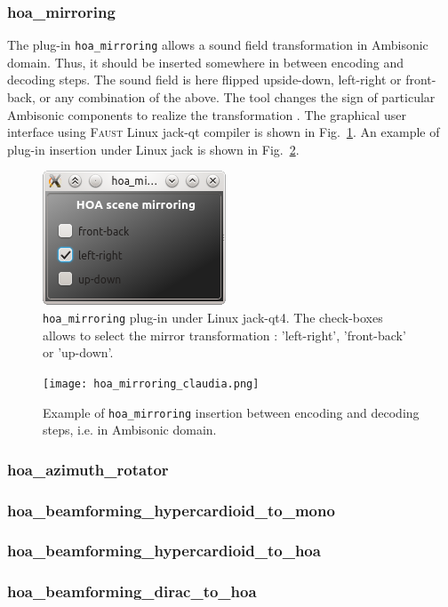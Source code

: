 \documentclass[10pt,a4paper]{article}
\begin{document}
\subsubsection{hoa\_mirroring}
The plug-in \lstinline'hoa_mirroring' allows a sound field transformation in Ambisonic domain. Thus, it should be inserted somewhere in between encoding and decoding steps. The sound field is here flipped upside-down, left-right or front-back, or any combination of the above. The tool changes the sign of particular Ambisonic components to realize the transformation \cite{kronlachner2014spatial}. The graphical user interface using \textsc{Faust} Linux jack-qt compiler is shown in Fig.~\ref{fig:hoa_mirroring}. An example of plug-in insertion under Linux jack is shown in Fig.~\ref{fig:hoa_mirroring_claudia}.
\begin{figure}[!ht]
\centering
\includegraphics[width=0.3\columnwidth]{hoa_mirroring.png}
\caption{\lstinline'hoa_mirroring' plug-in under Linux jack-qt4. The check-boxes allows to select the mirror transformation : 'left-right', 'front-back' or 'up-down'.}
\label{fig:hoa_mirroring}
\end{figure}
\begin{figure}[!ht]
\centering
\texttt{[image: hoa\_mirroring\_claudia.png]}
\caption{Example of \lstinline'hoa_mirroring' insertion between encoding and decoding steps, i.e. in Ambisonic domain.}
\label{fig:hoa_mirroring_claudia}
\end{figure}

\pagebreak
\subsubsection{hoa\_azimuth\_rotator}
\subsubsection{hoa\_beamforming\_hypercardioid\_to\_mono}
\subsubsection{hoa\_beamforming\_hypercardioid\_to\_hoa}
\subsubsection{hoa\_beamforming\_dirac\_to\_hoa}
\end{document}
